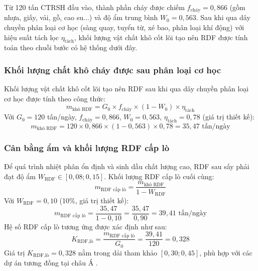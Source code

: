 \documentclass[../main.tex]{subfiles}
\begin{document}
Từ 120 tấn CTRSH đầu vào, thành phần cháy được chiếm $f_{\text{cháy}} = 0{,}866$ (gồm nhựa, giấy, vải, gỗ, cao su...) và độ ẩm trung bình $W_0 = 0{,}563$. Sau khi qua dây chuyền phân loại cơ học (sàng quay, tuyển từ, xé bao, phân loại khí động) với hiệu suất tách lọc $\eta_{\text{tách}}$, khối lượng vật chất khô cốt lõi tạo nên RDF được tính toán theo chuỗi bước có hệ thống dưới đây.

\subsubsection{Khối lượng chất khô cháy được sau phân loại cơ học}

Khối lượng vật chất khô cốt lõi tạo nên RDF sau khi qua dây chuyền phân loại cơ học được tính theo công thức:
\begin{equation}
  m_{\text{khô RDF}} = G_0 \times f_{\text{cháy}} \times (1 - W_0) \times \eta_{\text{tách}}
  \label{eq:khoi-luong-kho-rdf}
\end{equation}
Với $G_0 = 120$ tấn/ngày, $f_{\text{cháy}} = 0{,}866$, $W_0 = 0{,}563$, $\eta_{\text{tách}} = 0{,}78$ (giá trị thiết kế):
\begin{equation}
  m_{\text{khô RDF}} = 120 \times 0{,}866 \times (1 - 0{,}563) \times 0{,}78 = 35{,}47 \text{ tấn/ngày}
\end{equation}

\subsubsection{Cân bằng ẩm và khối lượng RDF cấp lò}

Để quá trình nhiệt phân ổn định và sinh dầu chất lượng cao, RDF sau sấy phải đạt độ ẩm $W_{\text{RDF}} \in [0{,}08; 0{,}15]$. Khối lượng RDF cấp lò cuối cùng:
\begin{equation}
  m_{\text{RDF cấp lò}} = \frac{m_{\text{khô RDF}}}{1 - W_{\text{RDF}}}
  \label{eq:khoi-luong-rdf-cap-lo}
\end{equation}
Với $W_{\text{RDF}} = 0{,}10$ (10\%, giá trị thiết kế):
\begin{equation}
  m_{\text{RDF cấp lò}} = \frac{35{,}47}{1 - 0{,}10} = \frac{35{,}47}{0{,}90} = 39{,}41 \text{ tấn/ngày}
\end{equation}
Hệ số RDF cấp lò tương ứng được xác định như sau:
\begin{equation}
  K_{\text{RDF,lò}} = \frac{m_{\text{RDF cấp lò}}}{G_0} = \frac{39{,}41}{120} = 0{,}328
\end{equation}
Giá trị $K_{\text{RDF,lò}} = 0{,}328$ nằm trong dải tham khảo $[0{,}30; 0{,}45]$, phù hợp với các dự án tương đồng tại châu Á \cite{Arena2012}.
\end{document}
